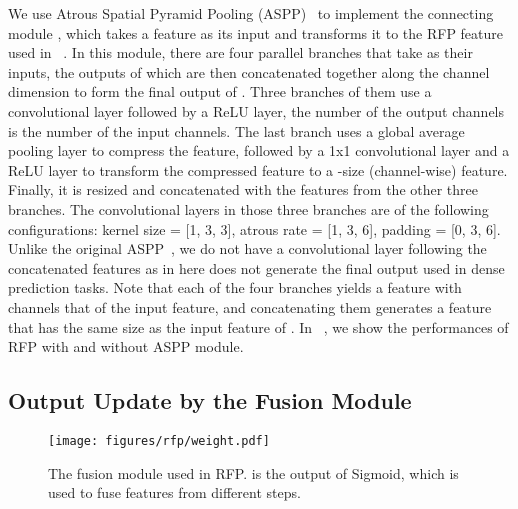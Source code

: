 \documentclass[final]{cvpr}
\begin{document}
We use Atrous Spatial Pyramid Pooling (ASPP)~\cite{chen2017deeplab} to implement the connecting module , which takes a feature  as its input and transforms it to the RFP feature used in ~.
In this module, there are four parallel branches that take  as their inputs, the outputs of which are then concatenated together along the channel dimension to form the final output of .
Three branches of them use a convolutional layer followed by a ReLU layer, the number of the output channels is  the number of the input channels.
The last branch uses a global average pooling layer to compress the feature, followed by a 1x1 convolutional layer and a ReLU layer to transform the compressed feature to a -size (channel-wise) feature. Finally, it is resized and concatenated with the features from the other three branches.
The convolutional layers in those three branches are of the following configurations: kernel size = [1, 3, 3], atrous rate = [1, 3, 6], padding = [0, 3, 6].
Unlike the original ASPP~\cite{chen2017deeplab}, we do not have a convolutional layer following the concatenated features as in here  does not generate the final output used in dense prediction tasks.
Note that each of the four branches yields a feature with channels  that of the input feature, and concatenating them generates a feature that has the same size as the input feature of .
In ~, we show the performances of RFP with and without ASPP module.

\subsection{Output Update by the Fusion Module}

\begin{figure}[t]
    \centering
    \texttt{[image: figures/rfp/weight.pdf]}
    \caption{The fusion module used in RFP.
     is the output of Sigmoid, which is used to fuse features from different steps.
    }
    \label{fig:weight}
\end{figure}
\end{document}

